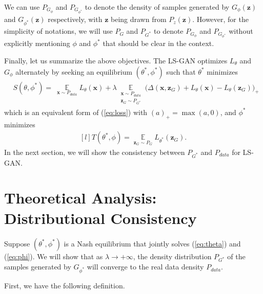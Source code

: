 \documentclass[11pt,fullpage, letterpaper,twoside]{article}
\newcommand{\1}[1]{\mathds{1}_{\left[#1\right]}}
\begin{document}
We can use $P_{G_\phi}$ and $P_{G_{\phi^*}}$ to denote the density of samples generated by $G_\phi(\mathbf z)$ and $G_{\phi^*}(\mathbf z)$ respectively, with $\mathbf z$ being drawn from $P_z(\mathbf z)$. However, for the simplicity of notations, we will use $P_{G}$ and $P_{G^*}$ to denote $P_{G_\phi}$ and $P_{G_{\phi^*}}$ without explicitly mentioning $\phi$ and $\phi^*$ that should be clear in the context.










Finally, let us summarize the above objectives. The LS-GAN optimizes $L_\theta$ and $G_\phi$ alternately by seeking an equilibrium $(\theta^*,\phi^*)$ such that $\theta^*$ minimizes
\begin{align}\label{eq:theta}
&S(\theta,\phi^*)=~\mathop \mathbb E\limits_{\mathbf x\sim P_{data}} L_\theta(\mathbf x) + \lambda \mathop \mathbb E\limits_{\substack{\mathbf x\sim P_{data} \\ \mathbf z_G\sim P_{G^*}}}\big( \Delta(\mathbf x, \mathbf z_G) + L_\theta(\mathbf x) - L_\theta(\mathbf z_G) \big)_+
\end{align}
which is an equivalent form of (\ref{eq:loss}) with $(a)_+=\max(a,0)$, and $\phi^*$ minimizes
\begin{equation}\label{eq:phi}
\begin{aligned}[l]
T(\theta^*,\phi)=\mathop \mathbb E\limits_{\mathbf z_G\sim P_{G}} L_{\theta^*}(\mathbf z_G).
\end{aligned}
\end{equation}
In the next section, we will show the consistency between $P_{G^*}$ and $P_{data}$ for LS-GAN.








\section{Theoretical Analysis: Distributional Consistency}\label{sec:theory}

Suppose $(\theta^*,\phi^*)$ is a Nash equilibrium that jointly solves  (\ref{eq:theta}) and (\ref{eq:phi}).  We will show that as $\lambda\rightarrow +\infty$, the density distribution $P_{G^*}$ of the samples generated by $G_{\phi^*}$ will converge to the real data density $P_{data}$.



First, we have the following definition.
\end{document}
